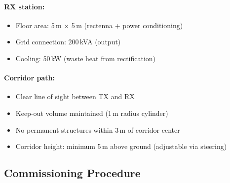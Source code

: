 \documentclass[11pt,a4paper]{article}
\begin{document}
\paragraph{RX station:}
\begin{itemize}
\item Floor area: 5\,m $\times$ 5\,m (rectenna + power conditioning)
\item Grid connection: 200\,kVA (output)
\item Cooling: 50\,kW (waste heat from rectification)
\end{itemize}

\paragraph{Corridor path:}
\begin{itemize}
\item Clear line of sight between TX and RX
\item Keep-out volume maintained (1\,m radius cylinder)
\item No permanent structures within 3\,m of corridor center
\item Corridor height: minimum 5\,m above ground (adjustable via steering)
\end{itemize}

\subsection{Commissioning Procedure}
\end{document}
